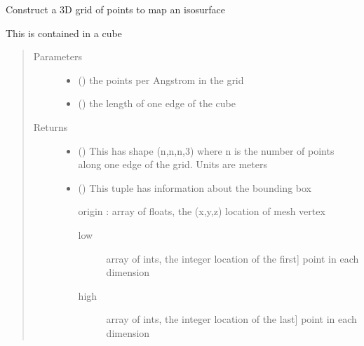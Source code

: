 \documentclass[a4paper,10pt,english]{sphinxmanual}
\begin{document}
\begin{fulllineitems}
\begin{fulllineitems}
\begin{fulllineitems}
\label{\detokenize{reference/generated/paramagpy.metal.Metal.make_mesh:paramagpy.metal.Metal.make_mesh}}
Construct a 3D grid of points to map an isosurface

This is contained in a cube
\begin{quote}\begin{description}
\item[{Parameters}] \leavevmode\begin{itemize}
\item {} 
 (\sphinxstyleliteralemphasis{\sphinxupquote{ (}}\sphinxstyleliteralemphasis{\sphinxupquote{)}}) \textendash{} the points per Angstrom in the grid

\item {} 
 (\sphinxstyleliteralemphasis{\sphinxupquote{ (}}\sphinxstyleliteralemphasis{\sphinxupquote{)}}) \textendash{} the length of one edge of the cube

\end{itemize}

\item[{Returns}] \leavevmode
\begin{itemize}
\item {} 
 () \textendash{} This has shape (n,n,n,3) where n is the number of points
along one edge of the grid. Units are meters

\item {} 
 () \textendash{} This tuple has information about the bounding box

origin : array of floats, the (x,y,z) location of mesh vertex
\begin{description}
\item[{low}] \leavevmode{[}array of ints, the integer location of the first{]}
point in each dimension

\item[{high}] \leavevmode{[}array of ints, the integer location of the last{]}
point in each dimension


\end{description}
\end{itemize}
\end{description}
\end{quote}
\end{fulllineitems}
\end{fulllineitems}
\end{fulllineitems}
\end{document}
